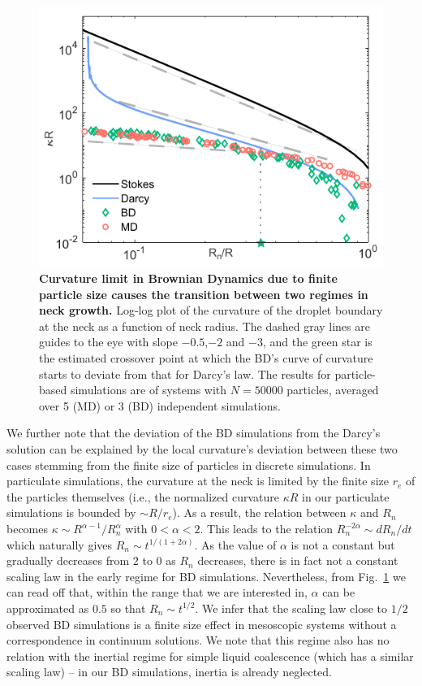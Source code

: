 \documentclass[%
reprint,
amsmath,amssymb,
aps,
]{revtex4-2}
\begin{document}
 \begin{figure}[h]
		\centering
		\includegraphics[width=\columnwidth]{Figure6.pdf}
		\caption{\textbf{Curvature limit in Brownian Dynamics due to finite particle size causes the transition between two regimes in neck growth.} Log-log plot of the curvature of the droplet boundary at the neck as a function of neck radius. The dashed gray lines are guides to the eye with slope $-0.5$,$-2$ and $-3$, and the green star is the estimated crossover point at which the BD's curve of curvature starts to deviate from that for Darcy's law. The results for particle-based simulations are of systems with $N=50000$ particles, averaged over 5 (MD) or 3 (BD) independent simulations.}
		\label{fig:curvature}
	\end{figure}
	
 We further note that the deviation of the BD simulations from the Darcy's solution can be explained by the local curvature's deviation between these two cases stemming from the finite size of particles in discrete simulations. In particulate simulations, the curvature at the neck is limited by the finite size $r_e$ of the particles themselves (i.e., the normalized curvature $\kappa R$ in our particulate simulations is bounded by $\sim R/r_e$). As a result, the relation between $\kappa$ and $R_n$ becomes $\kappa \sim R^{\alpha-1}/R^\alpha_n$ with $0<\alpha<2$. This leads to the relation $R_n^{-2\alpha}\sim dR_n/dt$ which naturally gives $R_n \sim t^{1/(1+2\alpha)}$.  As the value of $\alpha$ is not a constant but gradually decreases from $2$ to $0$ as $R_n$ decreases, there is in fact not a constant scaling law in the early regime for BD simulations. Nevertheless, from Fig.~\ref{fig:curvature} we can read off that, within the range that we are interested in, $\alpha$ can be approximated as $0.5$ so that $R_n\sim t^{1/2}$. We infer that the scaling law close to $1/2$ observed BD simulations is a finite size effect in mesoscopic systems without a correspondence in continuum solutions. We note that this regime also has no relation with the inertial regime for simple liquid coalescence (which has a similar scaling law) -- in our BD simulations, inertia is already neglected.
\end{document}
